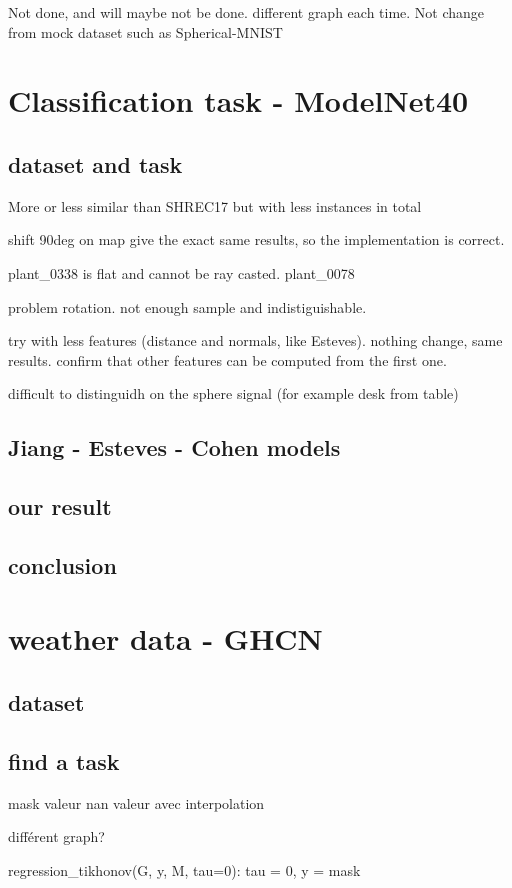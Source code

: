 \documentclass[11pt]{report}
\begin{document}
Not done, and will maybe not be done. different graph each time. Not change from mock dataset such as Spherical-MNIST
\section{Classification task - ModelNet40}
\subsection{dataset and task}
More or less similar than SHREC17 but with less instances in total

shift 90deg on map give the exact same results, so the implementation is correct.

plant\_0338 is flat and cannot be ray casted.
plant\_0078

problem rotation. not enough sample and indistiguishable.

try with less features (distance and normals, like Esteves). nothing change, same results. confirm that other features can be computed from the first one.

difficult to distinguidh on the sphere signal (for example desk from table)
\subsection{Jiang - Esteves - Cohen models}

\subsection{our result}

\subsection{conclusion}
\section{weather data - GHCN}
\subsection{dataset}
\subsection{find a task}
mask valeur nan
valeur avec interpolation

différent graph?

regression\_tikhonov(G, y, M, tau=0): tau = 0, y = mask
\end{document}
